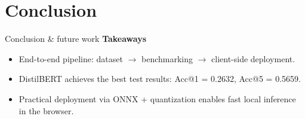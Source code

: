 \documentclass[t, aspectratio=169]{beamer}
\begin{document}
	\section{Conclusion}
	
	\begin{frame}{Conclusion \& future work}
		\textbf{Takeaways}
		\begin{itemize}
			\item End-to-end pipeline: dataset $\rightarrow$ benchmarking $\rightarrow$ client-side deployment.
			\item DistilBERT achieves the best test results: Acc@1 = 0.2632, Acc@5 = 0.5659.
			\item Practical deployment via ONNX + quantization enables fast local inference in the browser.
		\end{itemize}
	\end{frame}	
	\hustthankyou
	
\end{document}
